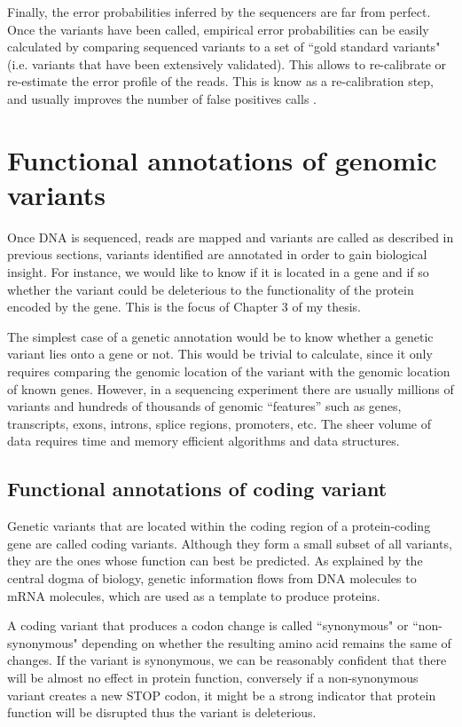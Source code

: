 Finally, the error probabilities inferred by the sequencers are far from perfect.  Once the variants have been called, empirical error probabilities can be easily calculated \cite{mckenna2010genome} by comparing sequenced variants to a set of ``gold standard variants" (i.e. variants that have been extensively validated).  This allows to re-calibrate or re-estimate the error profile of the reads.  This is know as a re-calibration step, and usually improves the number of false positives calls \cite{depristo2011framework}.

\section{Functional annotations of genomic variants \label{sec:funann}}

Once DNA is sequenced, reads are mapped and variants are called as described in previous sections, variants identified are annotated in order to gain biological insight. For instance, we would like to know if it is located in a gene and if so whether the variant could be deleterious to the functionality of the protein encoded by the gene. This is the focus of Chapter 3 of my thesis.

The simplest case of a genetic annotation would be to know whether a genetic variant lies onto a gene or not. This would be trivial to calculate, since it only requires comparing the genomic location of the variant with the genomic location of known genes. However, in a sequencing experiment there are usually millions of variants and hundreds of thousands of genomic ``features'' such as genes, transcripts, exons, introns, splice regions, promoters, etc. The sheer volume of data requires time and memory efficient algorithms and data structures.

\subsection{Functional annotations of coding variant}

Genetic variants that are located within the coding region of a protein-coding gene are called coding variants. Although they form a small subset of all variants, they are the ones whose function can best be predicted.  As explained by the central dogma of biology, genetic information flows from DNA molecules to mRNA molecules, which are used as a template to produce proteins. 

A coding variant that produces a codon change is called ``synonymous" or ``non-synonymous" depending on whether the resulting amino acid remains the same of changes. If the variant is synonymous, we can be reasonably confident that there will be almost no effect in protein function, conversely if a non-synonymous variant creates a new STOP codon, it might be a strong indicator that protein function will be  disrupted thus the variant is deleterious.

